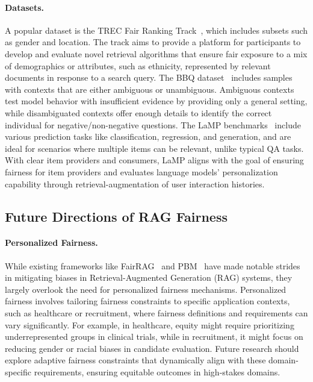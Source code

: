 \paragraph{Datasets.} A popular dataset is the TREC Fair Ranking Track~\cite{ekstrand2023overview, craswell2020overview}, which includes subsets such as gender and location. The track aims to provide a platform for participants to develop and evaluate novel retrieval algorithms that ensure fair exposure to a mix of demographics or attributes, such as ethnicity, represented by relevant documents in response to a search query. The BBQ dataset~\cite{parrish2021bbq} includes samples with contexts that are either ambiguous or unambiguous. Ambiguous contexts test model behavior with insufficient evidence by providing only a general setting, while disambiguated contexts offer enough details to identify the correct individual for negative/non-negative questions. The LaMP benchmarks~\cite{salemi2023lamp} include various prediction tasks like classification, regression, and generation, and are ideal for scenarios where multiple items can be relevant, unlike typical QA tasks. With clear item providers and consumers, LaMP aligns with the goal of ensuring fairness for item providers and evaluates language models' personalization capability through retrieval-augmentation of user interaction histories.

\subsection{Future Directions of RAG Fairness}

\paragraph{Personalized Fairness.} While existing frameworks like FairRAG~\cite{shrestha2024fairrag} and PBM~\cite{kong2024mitigating} have made notable strides in mitigating biases in Retrieval-Augmented Generation (RAG) systems, they largely overlook the need for personalized fairness mechanisms. Personalized fairness involves tailoring fairness constraints to specific application contexts, such as healthcare or recruitment, where fairness definitions and requirements can vary significantly. For example, in healthcare, equity might require prioritizing underrepresented groups in clinical trials, while in recruitment, it might focus on reducing gender or racial biases in candidate evaluation. Future research should explore adaptive fairness constraints that dynamically align with these domain-specific requirements, ensuring equitable outcomes in high-stakes domains.

